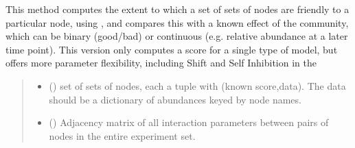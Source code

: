 \documentclass[letterpaper,10pt,english]{sphinxmanual}
\begin{document}
\begin{fulllineitems}
\label{\detokenize{scoring:score_net.score_light}}
\pysigstartsignatures
{}
\pysigstopsignatures
\sphinxAtStartPar
This method computes the extent to which a set of sets of nodes are friendly to a particular node, using ,
and compares this with a known effect of the community, which can be binary (good/bad) or continuous (e.g. relative abundance at a later time point). This version
only computes a score for a single type of model, but offers more parameter flexibility, including Shift and Self Inhibition in the {\hyperref[\detokenize{friendlynets:friendlyNet.friendlyNet.lotka_volterra_system}]{}}
\begin{quote}\begin{description}
\begin{itemize}
\item {} 
\sphinxAtStartPar
{} (\sphinxstyleliteralemphasis{\sphinxupquote{{[}}}\sphinxstyleliteralemphasis{\sphinxupquote{{[}}}\sphinxstyleliteralemphasis{\sphinxupquote{,}}\sphinxstyleliteralemphasis{\sphinxupquote{{]}}}\sphinxstyleliteralemphasis{\sphinxupquote{{]}}}) \textendash{} set of sets of nodes, each a tuple with (known score,data). The data should be a dictionary of abundances keyed by node names.

\item {} 
\sphinxAtStartPar
{} () \textendash{} Adjacency matrix of all interaction parameters between pairs of nodes in the entire experiment set.


\end{itemize}
\end{description}
\end{quote}
\end{fulllineitems}
\end{document}
